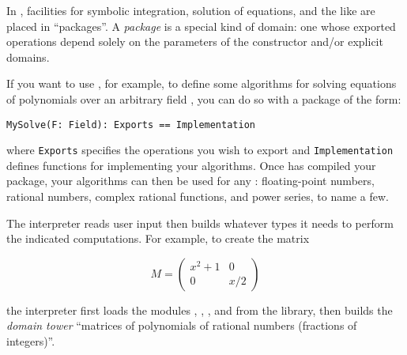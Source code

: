 
\par %
In \Language{}, facilities for symbolic integration, solution of equations, and the like
are placed in ``packages''.
A {\it package}
is a special kind of domain: one whose exported operations
depend solely on the parameters of the constructor and/or
explicit domains.

If you want to use \Language{}, for example, to define some algorithms for solving
equations of polynomials over an arbitrary field , you
can do so with a package of the form:

\begin{verbatim}
MySolve(F: Field): Exports == Implementation
\end{verbatim}

where {\tt Exports} specifies the  operations you wish to
export and {\tt Implementation} defines functions for implementing your algorithms.
Once \Language{} has compiled your package, your algorithms can then be used
for any : floating-point numbers, rational numbers, complex
rational functions, and power series, to name a few.



\par %
The \Language{} interpreter reads user input then builds whatever types
it needs to perform the indicated computations.
For example, to create the matrix
\begin{texonly}
\[M = \begin{pmatrix}x^2+1&0\\0&x / 2\end{pmatrix}\]
\end{texonly}
\begin{htonly}
\end{htonly}
the interpreter first loads the
modules , , ,
and  from the library, then builds the {\it domain tower}
``matrices of polynomials of rational numbers (fractions of integers)''.

